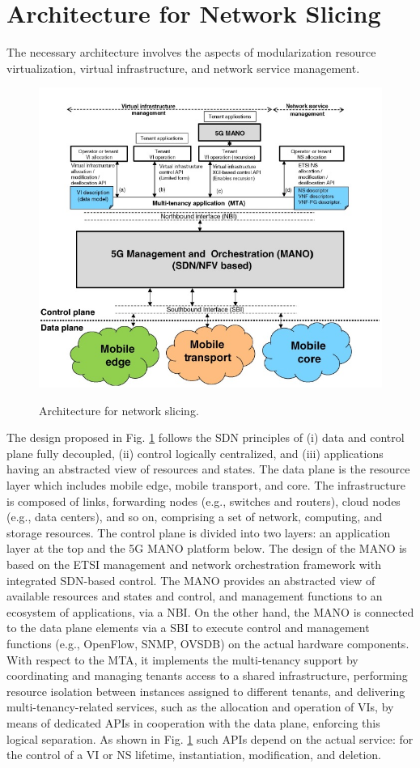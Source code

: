 \documentclass{article}
\begin{document}
\section{Architecture for Network Slicing}
The necessary architecture involves the aspects of modularization resource virtualization, virtual infrastructure, and network service management.
\begin{figure}[h]
\centering
\includegraphics[scale=0.67]{pics/2.JPG}
\label{Arch}
\caption{Architecture for network slicing.} 
\end{figure}
The design proposed in Fig. \ref{Arch} follows the SDN principles of
(i) data and control plane fully decoupled, (ii) control logically centralized, and (iii) applications having an abstracted view of resources and states.
The data plane is the resource layer which includes mobile edge, mobile transport, and core. The infrastructure is composed of links, forwarding nodes (e.g., switches and routers), cloud nodes (e.g., data centers), and so on, comprising a set of network, computing, and storage resources.
The control plane is divided into two layers: an application layer at the top and the 5G \gls{MANO} platform below. The design
of the MANO is based on the ETSI management and network orchestration framework with integrated SDN-based control. The MANO
provides an abstracted view of available resources and states and control, and
management functions to an ecosystem of applications, via a \gls{NBI}. On the other hand, the MANO is connected to the data plane
elements via a \gls{SBI} to execute control and management
functions (e.g., OpenFlow, SNMP, OVSDB) on the actual hardware components.
With respect to the \gls{MTA}, it implements the
multi-tenancy support by coordinating and managing tenants access to a shared
infrastructure, performing resource isolation between instances assigned to
different tenants, and delivering multi-tenancy-related services, such as the
allocation and operation of VIs, by means of dedicated APIs in cooperation
with the data plane, enforcing this logical separation. As shown in Fig. \ref{Arch}
such APIs depend on the actual service: for the control of a VI or NS lifetime,
instantiation, modification, and deletion.
\end{document}
